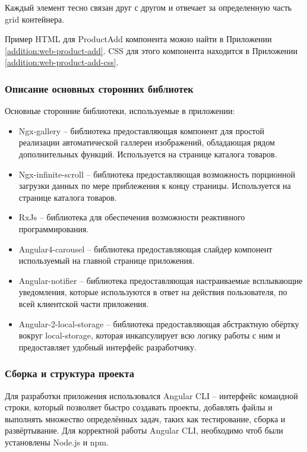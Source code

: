 Каждый элемент тесно связан друг с другом и отвечает за определенную часть grid контейнера.

Пример HTML для ProductAdd компонента можно найти в Приложении \ref{addition:web-product-add}.
CSS для этого компонента находится в Приложении \ref{addition:web-product-add-css}.

\subsubsection{Описание основных сторонних библиотек}\indent

Основные сторонние библиотеки, используемые в приложении:
\begin{itemize}
    \item Ngx-gallery – библиотека предоставляющая компонент для простой реализации автоматической галлереи изображений, обладающая рядом дополнительных функций.
    Используется на странице каталога товаров.
    \item Ngx-infinite-scroll – библиотека предоставляющая возможность порционной загрузки данных по мере приблежения к концу страницы.
    Используется на странице каталога товаров.
    \item RxJs – библиотека для обеспечения возможности реактивного программирования.
    \item Angular4-carousel – библиотека предоставляющая слайдер компонент используемый на главной странице приложения.
    \item Angular-notifier – библиотека предоставляющая настраиваемые всплывающие уведомления, которые используются в ответ на действия пользователя, по всей клиентской части приложения.
    \item Angular-2-local-storage – библиотека предоставляющая абстрактную обёртку вокруг local-storage, которая инкапсулирует всю логику работы с ним и предоставляет удобный интерфейс разработчику.
\end{itemize}

\subsubsection{Сборка и структура проекта}\indent

Для разработки приложения использовался Angular CLI – интерфейс командной строки, который позволяет быстро создавать проекты, добавлять файлы и выполнять множество определённых задач, таких как тестирование, сборка и развёртывание.
Для корректной работы Angular CLI, необходимо чтоб были установлены Node.js и npm.

